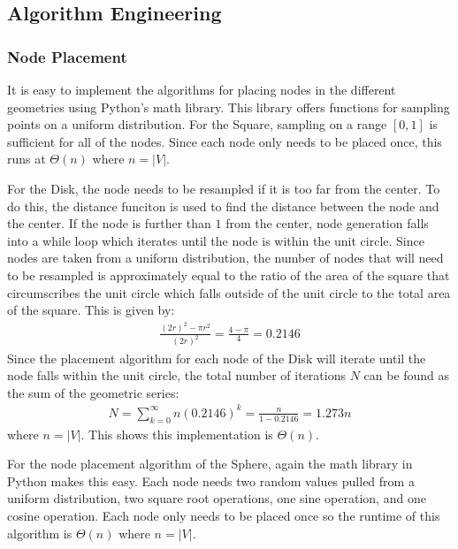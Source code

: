 \documentclass{article}
\begin{document}

    \subsection{Algorithm Engineering}

        \subsubsection{Node Placement}
        It is easy to implement the algorithms for placing nodes in the different geometries using Python's math library. This library offers functions for sampling points on a uniform distribution. For the Square, sampling on a range $[0,1]$ is sufficient for all of the nodes. Since each node only needs to be placed once, this runs at $\Theta(n)$ where $n = |V|$.
        \par
        For the Disk, the node needs to be resampled if it is too far from the center. To do this, the distance funciton is used to find the distance between the node and the center. If the node is further than $1$ from the center, node generation falls into a while loop which iterates until the node is within the unit circle. Since nodes are taken from a uniform distribution, the number of nodes that will need to be resampled is approximately equal to the ratio of the area of the square that circumscribes the unit circle which falls outside of the unit circle to the total area of the square. This is given by:
        \begin{align}
            \frac{(2r)^2-\pi r^2}{(2r)^2} = \frac{4-\pi}{4} = 0.2146
        \end{align}
        Since the placement algorithm for each node of the Disk will iterate until the node falls within the unit circle, the total number of iterations $N$ can be found as the sum of the geometric series:
        \begin{align}
            N = \sum_{k=0}^{\infty} n (0.2146)^k = \frac{n}{1-0.2146} = 1.273n
        \end{align}
        where $n = |V|$. This shows this implementation is $\Theta\left(n\right)$.
        \par
        For the node placement algorithm of the Sphere, again the math library in Python makes this easy. Each node needs two random values pulled from a uniform distribution, two square root operations, one sine operation, and one cosine operation. Each node only needs to be placed once so the runtime of this algorithm is $\Theta(n)$ where $n = |V|$.
\end{document}
